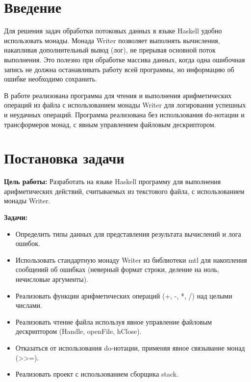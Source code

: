 \documentclass[a4paper, final]{article}
\begin{document}
\newpage

\tableofcontents

\newpage
\section*{Введение}

Для решения задач обработки потоковых данных в языке Haskell удобно использовать монады. Монада Writer позволяет выполнять вычисления, накапливая дополнительный вывод (лог), не прерывая основной поток выполнения. Это полезно при обработке массива данных, когда одна ошибочная запись не должна останавливать работу всей программы, но информацию об ошибке необходимо сохранить.

В работе реализована программа для чтения и выполнения арифметических операций из файла с использованием монады Writer  для логирования успешных и неудачных операций. Программа реализована без использования \texttt{do}-нотации и трансформеров монад, с явным управлением файловым дескриптором.



\newpage
\section*{Постановка задачи}
\par \textbf{Цель работы:} Разработать на языке Haskell программу для выполнения арифметических действий, считываемых из текстового файла, с использованием монады Writer.
\par \textbf{Задачи:}
\begin{itemize}
\item Определить типы данных для представления результата вычислений и лога ошибок.
\item Использовать стандартную монаду Writer из библиотеки mtl для накопления сообщений об ошибках (неверный формат строки, деление на ноль, нечисловые
аргументы).
\item Реализовать функции арифметических операций (+, -, *, /) над целыми числами.
\item Реализовать чтение файла используя явное управление файловым дескриптором
(Handle, openFile, hClose).
\item Отказаться от использования do-нотации, применяя явное связывание монад (>>=).
\item Реализовать проект с использованием сборщика stack.
\end{itemize}
\end{document}
